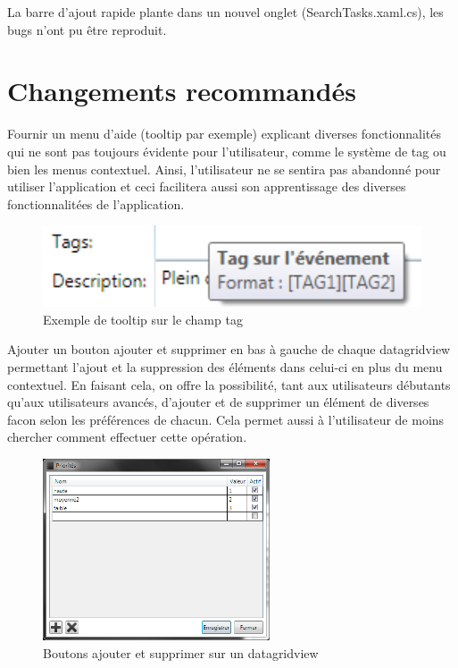 \documentclass[letterpaper, oneside, 12pt, these, creativecommons]{thETS}
\begin{document}
La barre d'ajout rapide plante dans un nouvel onglet (SearchTasks.xaml.cs), les bugs n'ont pu être reproduit.

\chapter{Changements recommandés}

Fournir un menu d'aide (tooltip par exemple) explicant diverses fonctionnalités qui ne sont pas toujours évidente pour l'utilisateur, comme le système de tag ou bien les menus contextuel. Ainsi, l'utilisateur ne se sentira pas abandonné pour utiliser l'application et ceci facilitera aussi son apprentissage des diverses fonctionnalitées de l'application.

\begin{figure}[H!]
	\centering
	\includegraphics[width=1\textwidth]{tags.png}
	\caption{Exemple de tooltip sur le champ tag}
\end{figure}

Ajouter un bouton ajouter et supprimer en bas à gauche de chaque datagridview permettant l'ajout et la suppression des éléments dans celui-ci en plus du menu contextuel. En faisant cela, on offre la possibilité, tant aux utilisateurs débutants qu'aux utilisateurs avancés, d'ajouter et de supprimer un élément de diverses facon selon les préférences de chacun. Cela permet aussi à l'utilisateur de moins chercher comment effectuer cette opération.

\begin{figure}[H!]
	\centering
	\includegraphics[width=0.6\textwidth]{add_delete_button.png}
	\caption{Boutons ajouter et supprimer sur un datagridview}
\end{figure}
\end{document}
